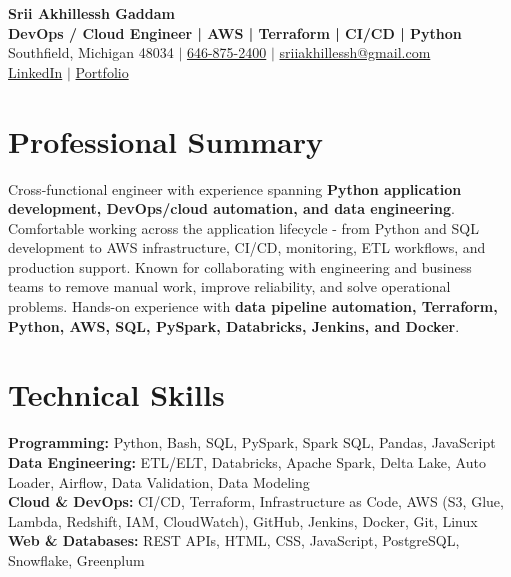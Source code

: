\documentclass[letterpaper,10pt]{article}
\begin{document}
\fontsize{9.35pt}{10.45pt}\selectfont

\begin{center}
    {\LARGE \textbf{Srii Akhillessh Gaddam}} \\[-1pt]
    \textbf{DevOps / Cloud Engineer | AWS | Terraform | CI/CD | Python} \\[2pt]
    Southfield, Michigan 48034 $|$
    \href{tel:6468752400}{646-875-2400} $|$
    \href{mailto:sriiakhillessh@gmail.com}{sriiakhillessh@gmail.com} \\[1pt]
    \href{https://www.linkedin.com/in/srii-akhiilessh-gaddam-b48668191/}{LinkedIn} $|$
    \href{https://sriiakhillesshg.github.io/portfolio/}{Portfolio}
\end{center}
\vspace{-8pt}

\section{Professional Summary}
\small{Cross-functional engineer with experience spanning \textbf{Python application development, DevOps/cloud automation, and data engineering}. Comfortable working across the application lifecycle - from Python and SQL development to AWS infrastructure, CI/CD, monitoring, ETL workflows, and production support. Known for collaborating with engineering and business teams to remove manual work, improve reliability, and solve operational problems. Hands-on experience with \textbf{data pipeline automation, Terraform, Python, AWS, SQL, PySpark, Databricks, Jenkins, and Docker}.}

\section{Technical Skills}
\small{
\textbf{Programming:} Python, Bash, SQL, PySpark, Spark SQL, Pandas, JavaScript \\
\textbf{Data Engineering:} ETL/ELT, Databricks, Apache Spark, Delta Lake, Auto Loader, Airflow, Data Validation, Data Modeling \\
\textbf{Cloud \& DevOps:} CI/CD, Terraform, Infrastructure as Code, AWS (S3, Glue, Lambda, Redshift, IAM, CloudWatch), GitHub, Jenkins, Docker, Git, Linux \\
\textbf{Web \& Databases:} REST APIs, HTML, CSS, JavaScript, PostgreSQL, Snowflake, Greenplum
}
\end{document}

